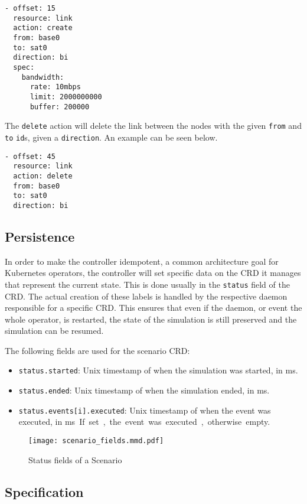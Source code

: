 \begin{verbatim}
- offset: 15
  resource: link
  action: create
  from: base0
  to: sat0
  direction: bi
  spec:
    bandwidth:
      rate: 10mbps
      limit: 2000000000
      buffer: 200000
\end{verbatim}

The \verb|delete| action will delete the link between the nodes with the given \verb|from| and \verb|to| \verb|id|s, given a \verb|direction|. An example can be seen below.

\begin{verbatim}
- offset: 45
  resource: link
  action: delete
  from: base0
  to: sat0
  direction: bi
\end{verbatim}

\subsection{Persistence}

In order to make the controller idempotent, a common architecture goal for Kubernetes operators, the controller will set specific data on the CRD it manages that represent the current state. This is done usually in the \verb|status| field of the CRD. The actual creation of these labels is handled by the respective daemon responsible for a specific CRD. This ensures that even if the daemon, or event the whole operator, is restarted, the state of the simulation is still preserved and the simulation can be resumed.

The following fields are used for the scenario CRD:

\begin{itemize}
  \item \verb|status.started|: Unix timestamp of when the simulation was started, in \si\ms.
  \item \verb|status.ended|: Unix timestamp of when the simulation ended, in \si\ms.
  \item \verb|status.events[i].executed|: Unix timestamp of when the event was executed, in \si\ms. If set, the event was executed, otherwise empty.
\end{itemize}

\begin{figure}[H]
  \label{fig:scenario-fields-lifecycle}
  \caption{Status fields of a Scenario}
  \centering
  \texttt{[image: scenario\_fields.mmd.pdf]}
\end{figure}

\subsection{Specification}

